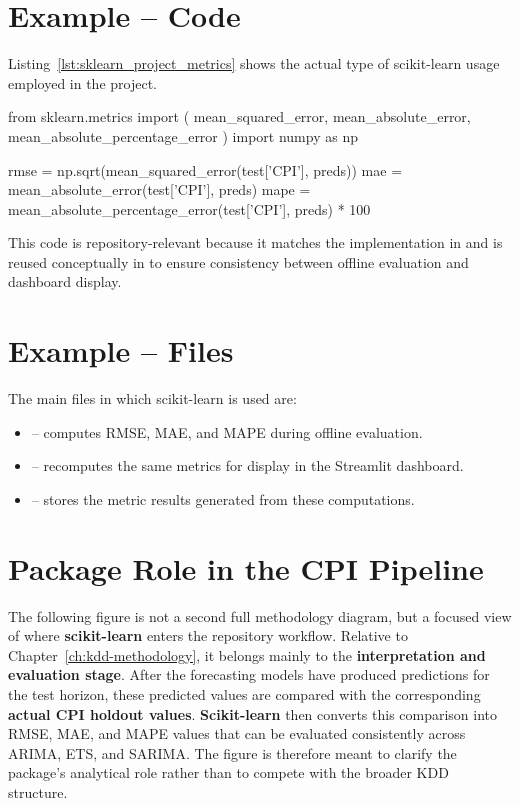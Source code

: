 \section{Example -- Code}

Listing~\ref{lst:sklearn_project_metrics} shows the actual type of scikit-learn usage employed in the project.

\begin{Python}[caption={Forecast evaluation with scikit-learn metrics}, label={lst:sklearn_project_metrics}]
	from sklearn.metrics import (
	mean_squared_error,
	mean_absolute_error,
	mean_absolute_percentage_error
	)
	import numpy as np
	
	rmse = np.sqrt(mean_squared_error(test['CPI'], preds))
	mae = mean_absolute_error(test['CPI'], preds)
	mape = mean_absolute_percentage_error(test['CPI'], preds) * 100
\end{Python}

This code is repository-relevant because it matches the implementation in  and is reused conceptually in  to ensure consistency between offline evaluation and dashboard display.

\section{Example -- Files}

The main files in which scikit-learn is used are:

\begin{itemize}
	\item {} -- computes RMSE, MAE, and MAPE during offline evaluation.
	\item {} -- recomputes the same metrics for display in the Streamlit dashboard.
	\item {} -- stores the metric results generated from these computations.
\end{itemize}

\section{Package Role in the CPI Pipeline}

The following figure is not a second full methodology diagram, but a focused view of where \textbf{scikit-learn} enters the repository workflow. Relative to Chapter~\ref{ch:kdd-methodology}, it belongs mainly to the \textbf{interpretation and evaluation stage}. After the forecasting models have produced predictions for the test horizon, these predicted values are compared with the corresponding \textbf{actual CPI holdout values}. \textbf{Scikit-learn} then converts this comparison into RMSE, MAE, and MAPE values that can be evaluated consistently across ARIMA, ETS, and SARIMA. The figure is therefore meant to clarify the package's analytical role rather than to compete with the broader KDD structure.


